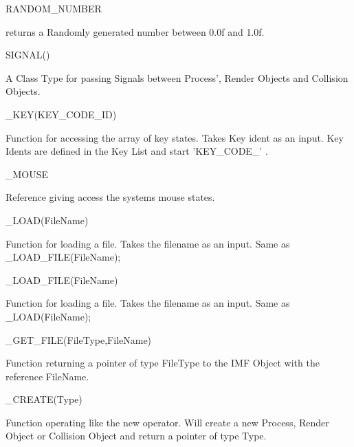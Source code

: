 \begin{DoxyItemize}
\item RANDOM\_\-NUMBER
\begin{DoxyItemize}
\item returns a Randomly generated number between 0.0f and 1.0f.
\end{DoxyItemize}
\item SIGNAL()
\begin{DoxyItemize}
\item A Class Type for passing Signals between Process', Render Objects and Collision Objects.
\end{DoxyItemize}
\item \_\-KEY(KEY\_\-CODE\_\-ID)
\begin{DoxyItemize}
\item Function for accessing the array of key states. Takes Key ident as an input. Key Idents are defined in the Key List and start 'KEY\_\-CODE\_\-' .
\end{DoxyItemize}
\item \_\-MOUSE
\begin{DoxyItemize}
\item Reference giving access the systems mouse states.
\end{DoxyItemize}
\item \_\-LOAD(FileName)
\begin{DoxyItemize}
\item Function for loading a file. Takes the filename as an input. Same as \_\-LOAD\_\-FILE(FileName);
\end{DoxyItemize}
\item \_\-LOAD\_\-FILE(FileName)
\begin{DoxyItemize}
\item Function for loading a file. Takes the filename as an input. Same as \_\-LOAD(FileName);
\end{DoxyItemize}
\item \_\-GET\_\-FILE(FileType,FileName)
\begin{DoxyItemize}
\item Function returning a pointer of type FileType to the IMF Object with the reference FileName.
\end{DoxyItemize}
\item \_\-CREATE(Type)
\begin{DoxyItemize}
\item Function operating like the new operator. Will create a new Process, Render Object or Collision Object and return a pointer of type Type.

\end{DoxyItemize}
\end{DoxyItemize}
